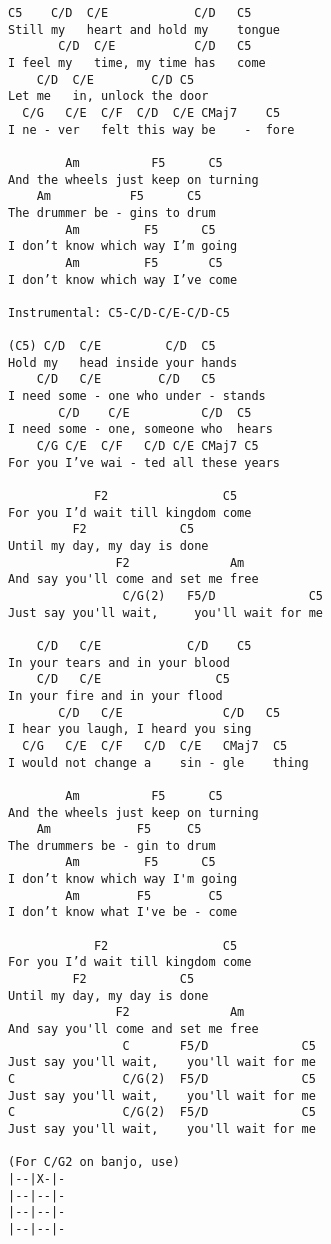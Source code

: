 \documentclass[leqno]{memoir}
\begin{document}
\begin{verbatim}
C5    C/D  C/E            C/D   C5
Still my   heart and hold my    tongue
       C/D  C/E           C/D   C5
I feel my   time, my time has   come
    C/D  C/E        C/D C5
Let me   in, unlock the door
  C/G   C/E  C/F  C/D  C/E CMaj7    C5
I ne - ver   felt this way be    -  fore

        Am          F5      C5
And the wheels just keep on turning
    Am           F5      C5
The drummer be - gins to drum
        Am         F5      C5
I don’t know which way I’m going
        Am         F5       C5
I don’t know which way I’ve come

Instrumental: C5-C/D-C/E-C/D-C5

(C5) C/D  C/E         C/D  C5
Hold my   head inside your hands
    C/D   C/E        C/D   C5
I need some - one who under - stands
       C/D    C/E          C/D  C5
I need some - one, someone who  hears
    C/G C/E  C/F   C/D C/E CMaj7 C5
For you I’ve wai - ted all these years

            F2                C5
For you I’d wait till kingdom come
         F2             C5
Until my day, my day is done
               F2              Am
And say you'll come and set me free
                C/G(2)   F5/D             C5
Just say you'll wait,     you'll wait for me

    C/D   C/E            C/D    C5
In your tears and in your blood
    C/D   C/E                C5
In your fire and in your flood
       C/D   C/E              C/D   C5
I hear you laugh, I heard you sing
  C/G   C/E  C/F   C/D  C/E   CMaj7  C5
I would not change a    sin - gle    thing

        Am          F5      C5
And the wheels just keep on turning
    Am            F5     C5
The drummers be - gin to drum
        Am         F5      C5
I don’t know which way I'm going
        Am        F5        C5
I don’t know what I've be - come

            F2                C5
For you I’d wait till kingdom come
         F2             C5
Until my day, my day is done
               F2              Am
And say you'll come and set me free
                C       F5/D             C5
Just say you'll wait,    you'll wait for me
C               C/G(2)  F5/D             C5
Just say you'll wait,    you'll wait for me
C               C/G(2)  F5/D             C5
Just say you'll wait,    you'll wait for me

(For C/G2 on banjo, use)
|--|X-|-
|--|--|-
|--|--|-
|--|--|-

\end{verbatim}
\newpage
\end{document}
